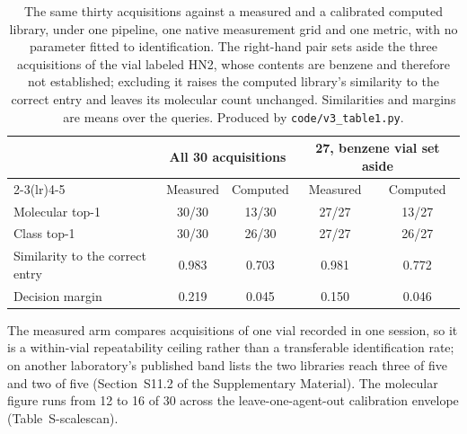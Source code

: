 \begin{table}[htbp]
\centering
\caption{The same thirty acquisitions against a measured and a calibrated computed library, under one pipeline, one native measurement grid and one metric, with no parameter fitted to identification. The right-hand pair sets aside the three acquisitions of the vial labeled HN2, whose contents are benzene and therefore not established; excluding it raises the computed library's similarity to the correct entry and leaves its molecular count unchanged. Similarities and margins are means over the queries. Produced by \texttt{code/v3\_table1.py}.}
\label{tab:headline}
\small
\begin{tabular}{lcccc}
\toprule
 & \multicolumn{2}{c}{All 30 acquisitions} & \multicolumn{2}{c}{27, benzene vial set aside} \\
\cmidrule(lr){2-3}\cmidrule(lr){4-5}
 & Measured & Computed & Measured & Computed \\
\midrule
Molecular top-1 & 30/30 & 13/30 & 27/27 & 13/27 \\
Class top-1 & 30/30 & 26/30 & 27/27 & 26/27 \\
Similarity to the correct entry & 0.983 & 0.703 & 0.981 & 0.772 \\
Decision margin & 0.219 & 0.045 & 0.150 & 0.046 \\
\bottomrule
\end{tabular}

\begin{flushleft}\footnotesize The measured arm compares acquisitions of one vial recorded in one session, so it is a within-vial repeatability ceiling rather than a transferable identification rate; on another laboratory's published band lists the two libraries reach three of five and two of five (Section~S11.2 of the Supplementary Material). The molecular figure runs from 12 to 16 of 30 across the leave-one-agent-out calibration envelope (Table~S-scalescan).\end{flushleft}
\end{table}
